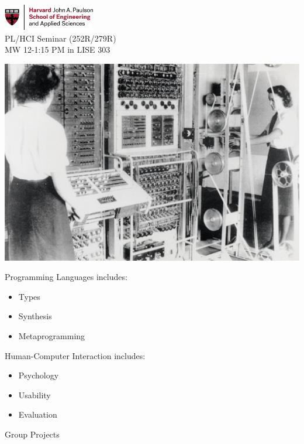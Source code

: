 \documentclass[14pt]{extarticle}
\begin{document}
\begin{center}
\includegraphics[width=0.3\textwidth]{H_SEAS_logo_RGB.jpg}
\\
\huge{PL/HCI Seminar (252R/279R)}\\
\large{MW 12-1:15 PM in LISE 303}\\
\end{center}

\includegraphics[width=\textwidth]{Colossus.jpg}




\begin{multicols}{2}
Programming Languages includes:
\begin{itemize}
\item Types
\item Synthesis
\item Metaprogramming
\end{itemize}

\columnbreak
Human-Computer Interaction includes:
\begin{itemize}
\item Psychology
\item Usability
\item Evaluation
\end{itemize}

\end{multicols}

\begin{center}
\large{Group Projects}\\
\end{center}
\end{document}
